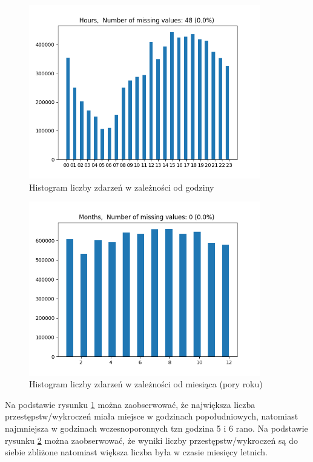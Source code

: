 \documentclass{classrep}
\begin{document}
{{{                \begin{figure}[!htbp]
                    \centering
                    \includegraphics[width=0.9\textwidth]{img/Hours-133549.png}
                    \caption{Histogram liczby zdarzeń w zależności od godziny}
                    \label{hist_hours}
                \end{figure}
                \begin{figure}[!htbp]
                    \centering
                    \includegraphics[width=0.9\textwidth]{img/Months-133554.png}
                    \caption{Histogram liczby zdarzeń w zależności od miesiąca (pory roku)}
                    \label{hist_months}
                \end{figure}
                \FloatBarrier

                Na podstawie rysunku \ref{hist_hours} można zaobserwować, że największa
                liczba przestępstw/wykroczeń miała miejsce w godzinach popołudniowych,
                natomiast najmniejsza w godzinach wczesnoporonnych tzn godzina 5 i 6
                rano. Na podstawie rysunku \ref{hist_months} można zaobserwować, że wyniki
                liczby przestępstw/wykroczeń są do siebie zbliżone natomiast większa
                liczba była w czasie miesięcy letnich.
                
}}}
\end{document}
